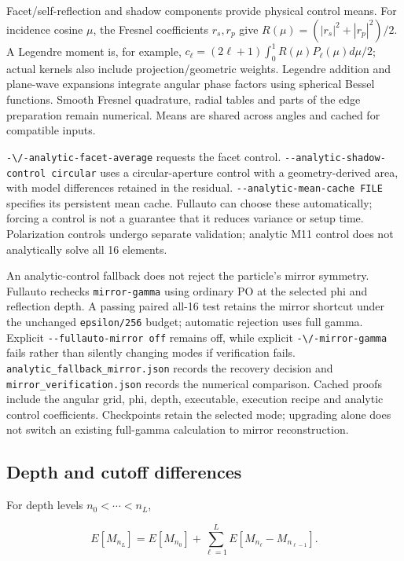Facet/self-reflection and shadow components provide physical control
means. For incidence cosine \(\mu\), the Fresnel coefficients
\(r_s,r_p\) give \(R(\mu)=(|r_s|^2+|r_p|^2)/2\). A Legendre moment is,
for example, \(c_\ell=(2\ell+1)\int_0^1R(\mu)P_\ell(\mu)d\mu/2\); actual
kernels also include projection/geometric weights. Legendre addition and
plane-wave expansions integrate angular phase factors using spherical
Bessel functions. Smooth Fresnel quadrature, radial tables and parts of
the edge preparation remain numerical. Means are shared across angles
and cached for compatible inputs.

\nolinkurl{-\/-analytic-facet-average} requests the facet control.
\texttt{-\/-analytic-shadow-control\ circular} uses a circular-aperture
control with a geometry-derived area, with model differences retained in
the residual. \texttt{-\/-analytic-mean-cache\ FILE} specifies its
persistent mean cache. Fullauto can choose these automatically; forcing
a control is not a guarantee that it reduces variance or setup time.
Polarization controls undergo separate validation; analytic M11 control
does not analytically solve all 16 elements.

An analytic-control fallback does not reject the particle's mirror
symmetry. Fullauto rechecks \texttt{mirror-gamma} using ordinary PO at
the selected phi and reflection depth. A passing paired all-16 test
retains the mirror shortcut under the unchanged \nolinkurl{epsilon/256}
budget; automatic rejection uses full gamma. Explicit
\texttt{-\/-fullauto-mirror\ off} remains off, while explicit
\nolinkurl{-\/-mirror-gamma} fails rather than silently changing modes if
verification fails. \nolinkurl{analytic_fallback_mirror.json} records the
recovery decision and \nolinkurl{mirror_verification.json} records the
numerical comparison. Cached proofs include the angular grid, phi,
depth, executable, execution recipe and analytic control coefficients.
Checkpoints retain the selected mode; upgrading alone does not switch an
existing full-gamma calculation to mirror reconstruction.

\subsection{Depth and cutoff
differences}\label{depth-and-cutoff-differences}

For depth levels \(n_0<\cdots<n_L\),

\[E[M_{n_L}]=E[M_{n_0}]+\sum_{\ell=1}^LE[M_{n_\ell}-M_{n_{\ell-1}}].\]

